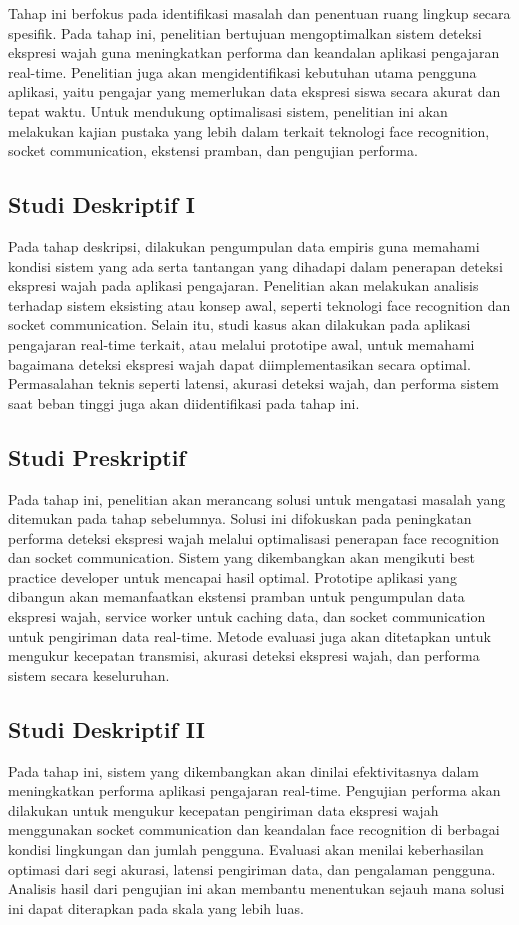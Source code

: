 Tahap ini berfokus pada identifikasi masalah dan penentuan ruang lingkup secara spesifik. Pada tahap ini, penelitian bertujuan mengoptimalkan sistem deteksi ekspresi wajah guna meningkatkan performa dan keandalan aplikasi pengajaran real-time. Penelitian juga akan mengidentifikasi kebutuhan utama pengguna aplikasi, yaitu pengajar yang memerlukan data ekspresi siswa secara akurat dan tepat waktu. Untuk mendukung optimalisasi sistem, penelitian ini akan melakukan kajian pustaka yang lebih dalam terkait teknologi face recognition, socket communication, ekstensi pramban, dan pengujian performa.

\subsection{Studi Deskriptif I}

Pada tahap deskripsi, dilakukan pengumpulan data empiris guna memahami kondisi sistem yang ada serta tantangan yang dihadapi dalam penerapan deteksi ekspresi wajah pada aplikasi pengajaran. Penelitian akan melakukan analisis terhadap sistem eksisting atau konsep awal, seperti teknologi face recognition dan socket communication. Selain itu, studi kasus akan dilakukan pada aplikasi pengajaran real-time terkait, atau melalui prototipe awal, untuk memahami bagaimana deteksi ekspresi wajah dapat diimplementasikan secara optimal. Permasalahan teknis seperti latensi, akurasi deteksi wajah, dan performa sistem saat beban tinggi juga akan diidentifikasi pada tahap ini.

\subsection{Studi Preskriptif}
Pada tahap ini, penelitian akan merancang solusi untuk mengatasi masalah yang ditemukan pada tahap sebelumnya. Solusi ini difokuskan pada peningkatan performa deteksi ekspresi wajah melalui optimalisasi penerapan face recognition dan socket communication. Sistem yang dikembangkan akan mengikuti best practice developer untuk mencapai hasil optimal. Prototipe aplikasi yang dibangun akan memanfaatkan ekstensi pramban untuk pengumpulan data ekspresi wajah, service worker untuk caching data, dan socket communication untuk pengiriman data real-time. Metode evaluasi juga akan ditetapkan untuk mengukur kecepatan transmisi, akurasi deteksi ekspresi wajah, dan performa sistem secara keseluruhan.

\subsection{Studi Deskriptif II}
Pada tahap ini, sistem yang dikembangkan akan dinilai efektivitasnya dalam meningkatkan performa aplikasi pengajaran real-time. Pengujian performa akan dilakukan untuk mengukur kecepatan pengiriman data ekspresi wajah menggunakan socket communication dan keandalan face recognition di berbagai kondisi lingkungan dan jumlah pengguna. Evaluasi akan menilai keberhasilan optimasi dari segi akurasi, latensi pengiriman data, dan pengalaman pengguna. Analisis hasil dari pengujian ini akan membantu menentukan sejauh mana solusi ini dapat diterapkan pada skala yang lebih luas.

